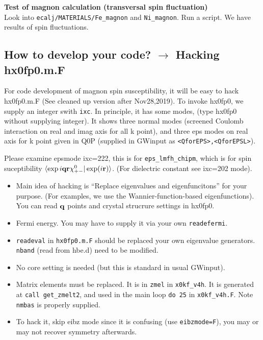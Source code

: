 \documentclass[a4paper,10pt,fleqn]{article}
\newcommand{\bfq}{{\bf q}}
\newcommand{\bfr}{{\bf r}}
\begin{document}
\noindent \textbf{Test of magnon calculation (transversal spin fluctuation)}\\
Look into \verb|ecalj/MATERIALS/Fe_magnon| and \verb|Ni_magnon|. Run a script.
We have results of spin fluctuations.

\subsection{How to develop your code? $\rightarrow$ Hacking hx0fp0.m.F}
For code development of magnon spin susceptibility, 
it will be easy to hack hx0fp0.m.F (See cleaned up version after
Nov28,2019).
To invoke hx0fp0, we supply an integer swith \verb#ixc#.
In principle, it has some modes, (type hx0fp0 without supplying
integer). It shows three normal modes (screened Coulomb interaction 
on real and imag axis for all k point), and three eps modes
on real axis for k point given in Q0P 
(supplied in GWinput as \verb#<QforEPS>,<QforEPSL>#).

Please examine epsmode ixc=222, this is for \verb#eps_lmfh_chipm#,
which is for spin suceptibility 
$\langle{\exp{i \bfq \bfr}}\chi^0_{+-}|\exp(i \bf \bfr) \rangle$.
(For dielectric constant see ixc=202 mode).

\begin{itemize}
 \item 
Main idea of hacking is 
``Replace eigenvalues and eigenfuncitons'' for your purpose.
(For examples, we use the Wannier-function-based eigenfunctions).
You can read $\bfq$ points and crystal strucrure settings in hx0fp0.

\item 
Fermi energy. You may have to supply it via your own \verb#readefermi#.

\item 
\verb#readeval# in \verb#hx0fp0.m.F# should be replaced your own 
eigenvalue generators. \verb#nband# (read from hbe.d) need to be modified.

\item 
 No core setting is needed (but this is standard in usual GWinput).

\item 
 Matrix elements must be replaced. It is in \verb#zmel# in
 \verb#x0kf_v4h#. It is generated at \verb#call get_zmelt2#, and used in 
 the main loop \verb#do 25# in \verb#x0kf_v4h.F#. Note \verb#nmbas# is
 properly supplied.
\item
 To hack it, skip eibz mode since it is confusing (use
 \verb#eibzmode=F#), you may or may not recover symmetry afterwards.

\end{itemize}
\end{document}
